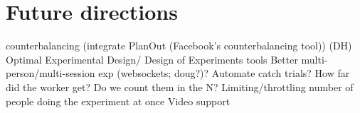 \documentclass[jou,apacite]{apa6}
\begin{document}
\section{Future directions}
counterbalancing (integrate PlanOut (Facebook's counterbalancing tool)) (DH)
Optimal Experimental Design/ Design of Experiments tools
Better multi-person/multi-session exp (websockets; doug?)?
Automate catch trials? How far did the worker get? Do we count them in the N? 
Limiting/throttling number of people doing the experiment at once
Video support


\end{document}
